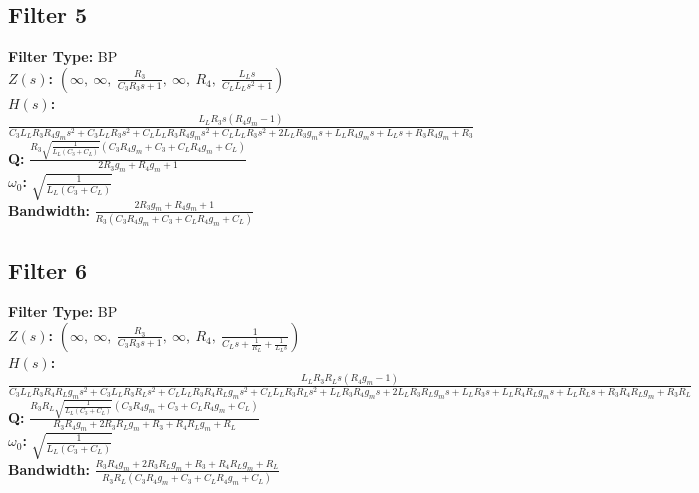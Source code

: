\documentclass{article}
\begin{document}
\subsection*{Filter 5}
\textbf{Filter Type:} BP \\ 
\textbf{$Z(s)$:} $\left( \infty, \  \infty, \  \frac{R_{3}}{C_{3} R_{3} s + 1}, \  \infty, \  R_{4}, \  \frac{L_{L} s}{C_{L} L_{L} s^{2} + 1}\right)$ \\ 
\textbf{$H(s)$:} $\frac{L_{L} R_{3} s \left(R_{4} g_{m} - 1\right)}{C_{3} L_{L} R_{3} R_{4} g_{m} s^{2} + C_{3} L_{L} R_{3} s^{2} + C_{L} L_{L} R_{3} R_{4} g_{m} s^{2} + C_{L} L_{L} R_{3} s^{2} + 2 L_{L} R_{3} g_{m} s + L_{L} R_{4} g_{m} s + L_{L} s + R_{3} R_{4} g_{m} + R_{3}}$ \\ 
\textbf{Q:} $\frac{R_{3} \sqrt{\frac{1}{L_{L} \left(C_{3} + C_{L}\right)}} \left(C_{3} R_{4} g_{m} + C_{3} + C_{L} R_{4} g_{m} + C_{L}\right)}{2 R_{3} g_{m} + R_{4} g_{m} + 1}$ \\ 
\textbf{$\omega_0$:} $\sqrt{\frac{1}{L_{L} \left(C_{3} + C_{L}\right)}}$ \\ 
\textbf{Bandwidth:} $\frac{2 R_{3} g_{m} + R_{4} g_{m} + 1}{R_{3} \left(C_{3} R_{4} g_{m} + C_{3} + C_{L} R_{4} g_{m} + C_{L}\right)}$ \\ 
\subsection*{Filter 6}
\textbf{Filter Type:} BP \\ 
\textbf{$Z(s)$:} $\left( \infty, \  \infty, \  \frac{R_{3}}{C_{3} R_{3} s + 1}, \  \infty, \  R_{4}, \  \frac{1}{C_{L} s + \frac{1}{R_{L}} + \frac{1}{L_{L} s}}\right)$ \\ 
\textbf{$H(s)$:} $\frac{L_{L} R_{3} R_{L} s \left(R_{4} g_{m} - 1\right)}{C_{3} L_{L} R_{3} R_{4} R_{L} g_{m} s^{2} + C_{3} L_{L} R_{3} R_{L} s^{2} + C_{L} L_{L} R_{3} R_{4} R_{L} g_{m} s^{2} + C_{L} L_{L} R_{3} R_{L} s^{2} + L_{L} R_{3} R_{4} g_{m} s + 2 L_{L} R_{3} R_{L} g_{m} s + L_{L} R_{3} s + L_{L} R_{4} R_{L} g_{m} s + L_{L} R_{L} s + R_{3} R_{4} R_{L} g_{m} + R_{3} R_{L}}$ \\ 
\textbf{Q:} $\frac{R_{3} R_{L} \sqrt{\frac{1}{L_{L} \left(C_{3} + C_{L}\right)}} \left(C_{3} R_{4} g_{m} + C_{3} + C_{L} R_{4} g_{m} + C_{L}\right)}{R_{3} R_{4} g_{m} + 2 R_{3} R_{L} g_{m} + R_{3} + R_{4} R_{L} g_{m} + R_{L}}$ \\ 
\textbf{$\omega_0$:} $\sqrt{\frac{1}{L_{L} \left(C_{3} + C_{L}\right)}}$ \\ 
\textbf{Bandwidth:} $\frac{R_{3} R_{4} g_{m} + 2 R_{3} R_{L} g_{m} + R_{3} + R_{4} R_{L} g_{m} + R_{L}}{R_{3} R_{L} \left(C_{3} R_{4} g_{m} + C_{3} + C_{L} R_{4} g_{m} + C_{L}\right)}$ \\ 
\end{document}
